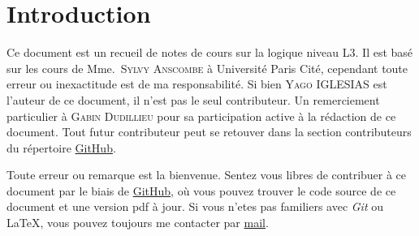 \section{Introduction}

Ce document est un recueil de notes de cours sur la logique niveau L3. Il est
basé sur les cours de Mme.~\textsc{Sylvy Anscombe} à Université Paris Cité, cependant toute
erreur ou inexactitude est de ma responsabilité.
Si bien \textsc{Yago IGLESIAS} est l'auteur de ce document, il n'est pas
le seul contributeur. Un remerciement particulier à \textsc{Gabin Dudillieu} pour sa
participation active à la rédaction de ce document. Tout futur contributeur
peut se retouver dans la section contributeurs du répertoire
\href{https://github.com/Yag000/logique-notes/graphs/contributors}{GitHub}.
\vspace{0.5cm}

Toute erreur ou remarque est la bienvenue.
Sentez vous libres de contribuer à ce document par le biais de \href{https://github.com/Yag000/logique-notes}{GitHub},
où vous pouvez trouver le code source de ce document et une version pdf à jour.
Si vous n'etes pas familiers avec \textit{Git} ou \LaTeX , vous pouvez toujours me contacter
par \href{mailto: yago.iglesias.vazquez@gmail.com}{mail}.






